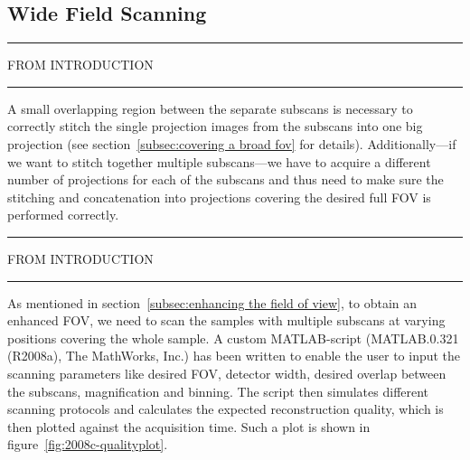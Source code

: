 
\subsection{Wide Field Scanning}
\hrule FROM INTRODUCTION\hrule \cbstart

A small overlapping region between the separate subscans is necessary to correctly stitch the single projection images from the subscans into one big projection (see section~\ref{subsec:covering a broad fov} for details). Additionally---if we want to stitch together multiple subscans---we have to acquire a different number of projections for each of the subscans and thus need to make sure the stitching and concatenation into projections covering the desired full FOV is performed correctly.

\hrule FROM INTRODUCTION\hrule \cbend

As mentioned in section~\ref{subsec:enhancing the field of view}, to obtain an enhanced FOV, we need to scan the samples with multiple subscans at varying positions covering the whole sample. A custom MATLAB-script (MATLAB.0.321 (R2008a), The MathWorks, Inc.) has been written to enable the user to input the scanning parameters like desired FOV, detector width, desired overlap between the subscans, magnification and binning. The script then simulates different scanning protocols and calculates the expected reconstruction quality, which is then plotted against the acquisition time. Such a plot is shown in figure~\ref{fig:2008c-qualityplot}.

